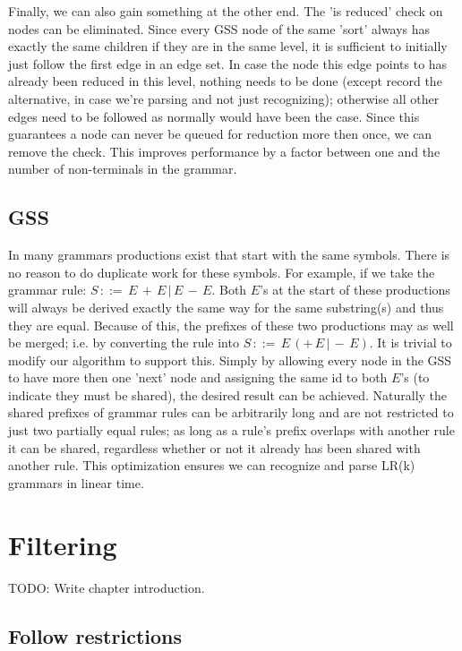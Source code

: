 \documentclass[a4paper,10pt]{article}
\begin{document}
Finally, we can also gain something at the other end. The 'is reduced' check on nodes can be eliminated. Since every GSS node of the same 'sort' always has exactly the same children if they are in the same level, it is sufficient to initially just follow the first edge in an edge set. In case the node this edge points to has already been reduced in this level, nothing needs to be done (except record the alternative, in case we're parsing and not just recognizing); otherwise all other edges need to be followed as normally would have been the case. Since this guarantees a node can never be queued for reduction more then once, we can remove the check. This improves performance by a factor between one and the number of non-terminals in the grammar.

\subsection{GSS}

In many grammars productions exist that start with the same symbols. There is no reason to do duplicate work for these symbols. For example, if we take the grammar rule: $S\,::=\,E\,+\,E\,|\,E\,-\,E$. Both $E$'s at the start of these productions will always be derived exactly the same way for the same substring(s) and thus they are equal. Because of this, the prefixes of these two productions may as well be merged; i.e. by converting the rule into $S\,::=\,E\,(+\,E\,|\,-\,E)$. It is trivial to modify our algorithm to support this. Simply by allowing every node in the GSS to have more then one 'next' node and assigning the same id to both $E$'s (to indicate they must be shared), the desired result can be achieved. Naturally the shared prefixes of grammar rules can be arbitrarily long and are not restricted to just two partially equal rules; as long as a rule's prefix overlaps with another rule it can be shared, regardless whether or not it already has been shared with another rule. This optimization ensures we can recognize and parse LR(k) grammars in linear time.

\section{Filtering}

TODO: Write chapter introduction.

\subsection{Follow restrictions}
\end{document}
